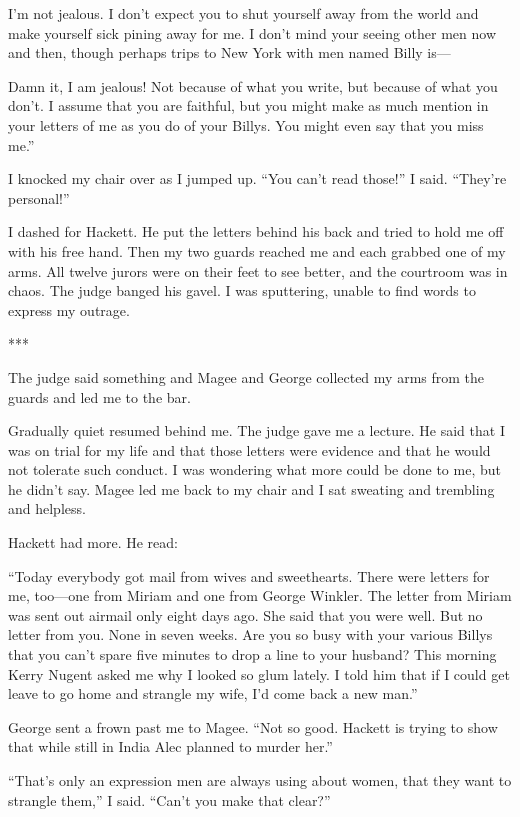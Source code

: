 \documentclass{novel}
\begin{document}
I’m not jealous. I don’t expect you to shut yourself away from the world and make yourself sick pining away for me. I don’t mind your seeing other men now and then, though perhaps trips to New York with men named Billy is—

Damn it, I am jealous! Not because of what you write, but because of what you don’t. I assume that you are faithful, but you might make as much mention in your letters of me as you do of your Billys. You might even say that you miss me.”

I knocked my chair over as I jumped up. “You can’t read those!” I said. “They’re personal!”

I dashed for Hackett. He put the letters behind his back and tried to hold me off with his free hand. Then my two guards reached me and each grabbed one of my arms. All twelve jurors were on their feet to see better, and the courtroom was in chaos. The judge banged his gavel. I was sputtering, unable to find words to express my outrage.

***

The judge said something and Magee and George collected my arms from the guards and led me to the bar.

Gradually quiet resumed behind me. The judge gave me a lecture. He said that I was on trial for my life and that those letters were evidence and that he would not tolerate such conduct. I was wondering what more could be done to me, but he didn’t say. Magee led me back to my chair and I sat sweating and trembling and helpless.

Hackett had more. He read:

“Today everybody got mail from wives and sweethearts. There were letters for me, too—one from Miriam and one from George Winkler. The letter from Miriam was sent out airmail only eight days ago. She said that you were well. But no letter from you. None in seven weeks. Are you so busy with your various Billys that you can’t spare five minutes to drop a line to your husband? This morning Kerry Nugent asked me why I looked so glum lately. I told him that if I could get leave to go home and strangle my wife, I’d come back a new man.”

George sent a frown past me to Magee. “Not so good. Hackett is trying to show that while still in India Alec planned to murder her.”

“That’s only an expression men are always using about women, that they want to strangle them,” I said. “Can’t you make that clear?”
\end{document}
